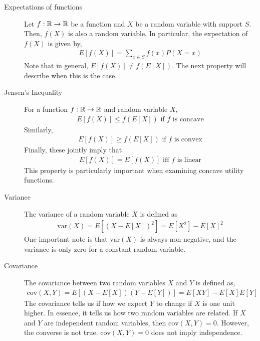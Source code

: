 \begin{description}
    \item[Expectations of functions] Let $f: \mathbb{R} \to \mathbb{R}$ be a function and $X$ be a random variable with support $S$. Then, $f(X)$ is also a random variable. In particular, the expectation of $f(X)$ is given by,
    \begin{align*}
        E[f(X)] = \sum_{x \in S} f(x) P(X = x)
    \end{align*} 
    Note that in general, $E[f(X)] \neq f(E[X])$. The next property will describe when this is the case.
    \item[Jensen's Inequality] For a function $f: \mathbb{R} \to \mathbb{R}$ and random variable $X$, 
    \begin{align*}
        E[f(X)] \leq f(E[X]) \text{ if $f$ is concave}
    \end{align*}
    Similarly,
    \begin{align*}
        E[f(X)] \geq f(E[X]) \text{ if $f$ is convex}
    \end{align*}
    Finally, these jointly imply that
    \begin{align*}
        E[f(X)] = E[f(X)] \text{ iff $f$ is linear}
    \end{align*}
    This property is particularly important when examining concave utility functions. 
    \item[Variance] The variance of a random variable $X$ is defined as
    \begin{align*}
        \text{var}(X) = E[(X - E[X])^2] = E[X^2] - E[X]^2
    \end{align*} 
    One important note is that $\text{var}(X)$ is always non-negative, and the variance is only zero for a constant random variable.
    \item[Covariance] The covariance between two random variables $X$ and $Y$ is defined as,
    \begin{align*}
        \text{cov}(X, Y) = E[(X - E[X])(Y - E[Y])] = E[XY] - E[X]E[Y]
    \end{align*} 
    The covariance tells us if how we expect $Y$ to change if $X$ is one unit higher. In essence, it tells us how two random variables are related. If $X$ and $Y$ are independent random variables, then $\text{cov}(X, Y) = 0$. However, the converse is not true. $\text{cov}(X, Y) = 0$ does not imply independence.
\end{description}

